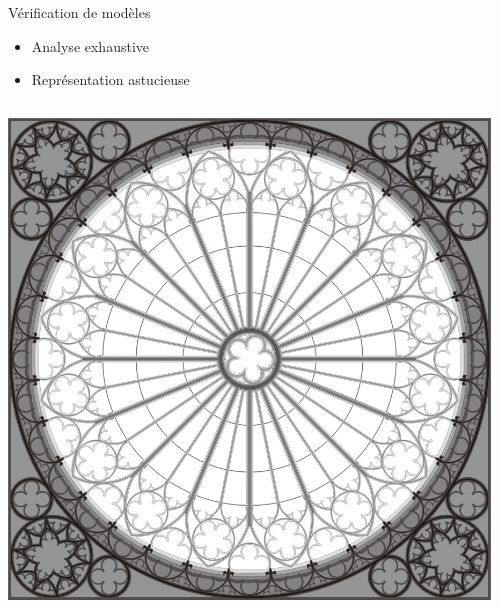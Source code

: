 \begin{frame}{Vérification de modèles}
  \begin{block}{}
    \begin{itemize}
    \item Analyse exhaustive
    \item Représentation astucieuse
    \end{itemize}
  \end{block}
  \begin{columns}
    \begin{column}{0.5\textwidth}
      \includegraphics[width=\textwidth]{media/rosace.jpg}
    \end{column}
    \begin{column}{0.5\textwidth}

\end{column}
\end{columns}
\end{frame}
